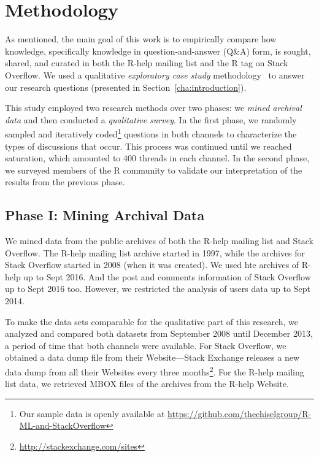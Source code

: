 \documentclass[smallextended]{svjour3}       %
\newcommand{\SO}{Stack Overflow\xspace}
\newcommand{\RH}{R-help\xspace}
\begin{document}
 \section{Methodology}
\label{cha:methodology}

As mentioned, the main goal of this work is to empirically compare how
knowledge, specifically knowledge in question-and-answer (Q\&A) form,
is sought, shared, and curated in both the \RH mailing list and the R
tag on \SO. We used a qualitative \textit{exploratory case study}
methodology~\cite{Creswell2009,Runeson2012} to answer our research
questions (presented in Section~\ref{cha:introduction}).
                    
This study employed two research methods over two phases: we
\textit{mined archival data} and then conducted a \textit{qualitative
  survey}. In the first phase, we randomly sampled and iteratively
coded\footnote{Our sample data is openly available at
  \url{https://github.com/thechiselgroup/R-ML-and-StackOverflow}}
questions in both channels to characterize the types of discussions
that occur. This process was continued until we reached saturation,
which amounted to 400 threads in each channel. In the second phase, we
surveyed members of the R community to validate our interpretation of
the results from the previous phase.

\subsection{Phase I: Mining Archival Data} 
\label{sec:studyDesign}

We mined data from the public archives of both the \RH mailing list and \SO. The \RH mailing list archive started in
1997, while the archives for \SO started in 2008 (when it was created). We used hte archives of \RH up to Sept 2016. And
the post and comments information of \SO up to Sept 2016 too. However, we restricted the analysis of users data up to
Sept 2014.

To make the
data sets comparable for the qualitative part of this research, we analyzed and compared both datasets from September 2008
until December 2013, a period of time that both channels were
available.  For \SO, we obtained a data dump file from their
Website---Stack Exchange releases a new data dump from all their
Websites every three
months\footnote{\url{http://stackexchange.com/sites}}. For the \RH
mailing list data, we retrieved MBOX files of the archives from the
\RH Website.
\end{document}
